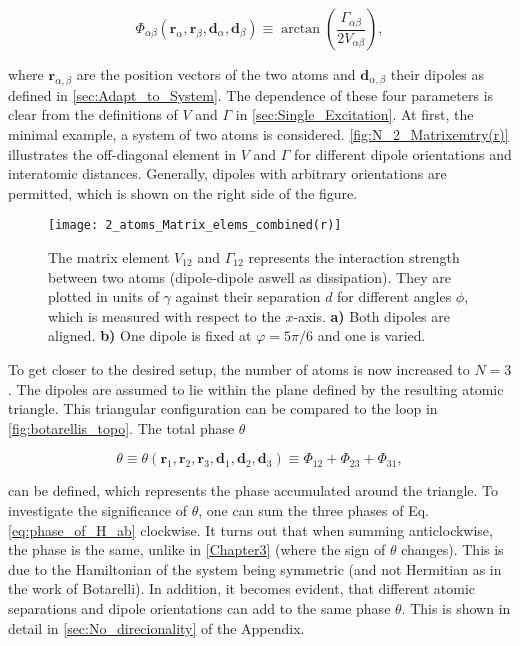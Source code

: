 \begin{equation} \label{eq:phase_of_H_ab}%
    \Phi_{\alpha\beta}(\mathbf{r}_\alpha, \mathbf{r}_\beta, \mathbf{d}_\alpha, \mathbf{d}_\beta) \equiv \arctan\left( \frac{\Gamma_{\alpha\beta}}{2V_{\alpha\beta}} \right),
\end{equation}

\noindent
where $ \mathbf{r}_{\alpha,\beta} $ are the position vectors of the two atoms and $ \mathbf{d}_{\alpha,\beta} $ their dipoles
as defined in \autoref{sec:Adapt_to_System}.
The dependence of these four parameters is clear from the definitions of $ V $ and $ \Gamma $ in \autoref{sec:Single_Excitation}.
At first, the minimal example, a system of two atoms is considered.
\autoref{fig:N_2_Matrixemtry(r)} illustrates the off-diagonal element in $ V $ and $ \Gamma $ for different dipole orientations and interatomic distances.
Generally, dipoles with arbitrary orientations are permitted, which is shown on the right side of the figure.

\begin{figure}[!ht]
    \centering
    \texttt{[image: 2\_atoms\_Matrix\_elems\_combined(r)]}
    \caption{The matrix element $ V_{12} $ and $ \Gamma_{12} $ represents the interaction strength between two atoms (dipole-dipole aswell as dissipation).
             They are plotted in units of $ \gamma $ against their separation $ d $ for different angles $ \phi $, which is measured with respect to the $x$-axis.
             \textbf{a)} Both dipoles are aligned.
             \textbf{b)} One dipole is fixed at $ \varphi = 5\pi/6 $ and one is varied.}
    \label{fig:N_2_Matrixemtry(r)}
\end{figure}

\noindent
To get closer to the desired setup, the number of atoms is now increased to $N = 3$.
The dipoles are assumed to lie within the plane defined by the resulting atomic triangle.
This triangular configuration can be compared to the loop in \autoref{fig:botarellis_topo}.
The total phase \( \theta \)

\begin{equation}
    \theta \equiv \theta (\mathbf{r}_1, \mathbf{r}_2, \mathbf{r}_3, \mathbf{d}_1, \mathbf{d}_2, \mathbf{d}_3) \equiv  \Phi_{12} + \Phi_{23} + \Phi_{31},
\end{equation}

\noindent
can be defined, which represents the phase accumulated around the triangle.
To investigate the significance of $ \theta $, one can sum the three phases of Eq. \eqref{eq:phase_of_H_ab}
clockwise.
It turns out that when summing anticlockwise, the phase is the same, unlike in \autoref{Chapter3} (where the sign of $ \theta $ changes).
This is due to the Hamiltonian of the system being symmetric (and not Hermitian as in the work of Botarelli).
In addition,
it becomes evident, that different atomic separations and dipole orientations can add to the same phase $ \theta $.
This is shown in detail in \autoref{sec:No_direcionality} of the Appendix.

